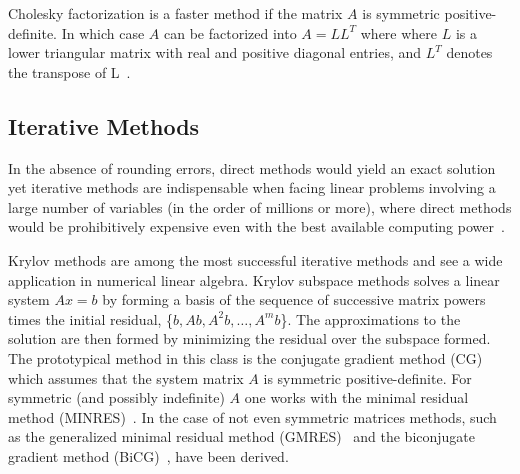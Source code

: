 Cholesky factorization is a faster method if the matrix $A$ is symmetric 
positive-definite. In which case $A$ can be factorized into $A = LL^T$ where 
where $L$ is a lower triangular matrix with real and positive diagonal entries, 
and $L^T$ denotes the transpose of L~\cite{nla}.

\subsection{Iterative Methods}
In the absence of rounding errors, direct methods would yield an exact solution 
yet iterative methods are indispensable when facing linear problems involving a 
large number of variables (in the order of millions or more), where direct 
methods would be prohibitively expensive even with the best available computing 
power~\cite{nla}. 

Krylov methods are among the most successful iterative methods and see a wide 
application in numerical linear algebra. Krylov subspace methods solves a linear 
system $Ax = b$ by forming a basis of the sequence of successive matrix powers 
times the initial residual, \{$b, Ab, A^2b, \ldots, A^mb$\}. The approximations 
to the solution are then formed by minimizing the residual over the subspace 
formed. The prototypical method in this class is the conjugate gradient method 
(CG)~\cite{cg} which assumes that the system matrix $A$ is symmetric 
positive-definite. For symmetric (and possibly indefinite) $A$ one works with 
the minimal residual method (MINRES)~\cite{minres}. In the case of not even 
symmetric matrices methods, such as the generalized minimal residual method 
(GMRES)~\cite{gmres} and the biconjugate gradient method (BiCG)~\cite{bicg}, 
have been derived.

